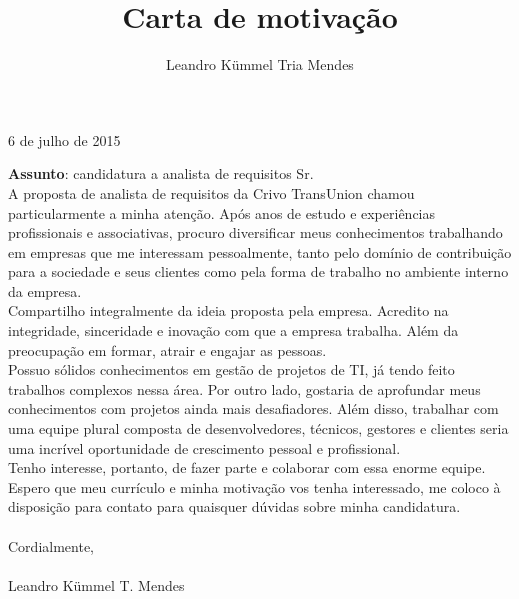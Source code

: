 \documentclass[a4paper,10pt]{article}
\title{Carta de motivação}
\author{Leandro Kümmel Tria Mendes}
\begin{document}
\begin{flushright} 
6 de julho de 2015
\end{flushright}
\textbf{Assunto}: candidatura a analista de requisitos Sr.\\

   A proposta de analista de requisitos da Crivo TransUnion chamou particularmente a minha atenção. Após anos de estudo e
experiências profissionais e associativas, procuro diversificar meus conhecimentos trabalhando em empresas que me interessam pessoalmente, 
tanto pelo domínio de contribuição para a sociedade e seus clientes 
como pela forma de trabalho no ambiente interno da empresa.\\

Compartilho integralmente da ideia proposta pela empresa. Acredito na
integridade, sinceridade e inovação com que a empresa trabalha.
Além da preocupação em formar, atrair e engajar as pessoas.\\

Possuo sólidos conhecimentos em gestão de projetos de TI, já tendo feito trabalhos complexos 
nessa área. Por outro lado, gostaria de aprofundar meus conhecimentos com projetos ainda mais desafiadores.
Além disso, trabalhar com uma equipe plural composta de
desenvolvedores, técnicos, gestores e clientes seria uma incrível oportunidade
de crescimento pessoal e profissional.\\

Tenho interesse, portanto, de fazer parte e colaborar com essa enorme equipe.
Espero que meu currículo e minha motivação vos tenha interessado, me
coloco à disposição para contato para quaisquer dúvidas sobre minha
candidatura.\\
\\
Cordialmente,\\
\\
Leandro Kümmel T. Mendes
\end{document}
